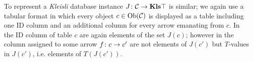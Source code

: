\documentclass[CT4S-EN-RU]{subfiles}
\begin{document}
\begin{blockRUS}
\end{blockRUS}

\begin{blockENG}
To represent a {\em Kleisli} database instance $J\colon\mathcal{C}\rightarrow{\mathbf{Kls}}{\top}$ is similar; we again use a tabular format in which every object $c\in\textnormal{Ob}(\mathcal{C})$ is displayed as a table including one ID column and an additional column for every arrow emanating from $c$. In the ID column of table $c$ are again elements of the set $J(c)$; however in the column assigned to some arrow $f\colon c\rightarrow c'$ are not elements of $J(c')$ but $T$-values in $J(c')$, i.e. elements of $T(J(c'))$. 
\end{blockENG}

\begin{blockRUS}
\end{blockRUS}
\end{document}
